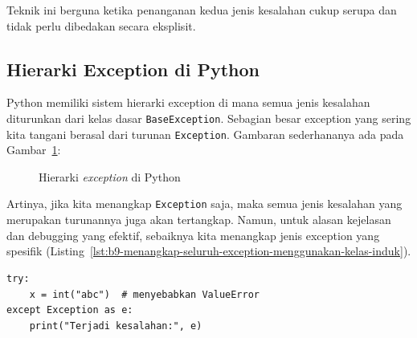 Teknik ini berguna ketika penanganan kedua jenis kesalahan cukup serupa dan tidak perlu dibedakan secara eksplisit.

\subsection*{Hierarki Exception di Python}

Python memiliki sistem hierarki exception di mana semua jenis kesalahan diturunkan dari kelas dasar \texttt{BaseException}. Sebagian besar exception yang sering kita tangani berasal dari turunan \texttt{Exception}.  
Gambaran sederhananya ada pada Gambar~\ref{fig:b9-hierarki}:

\begin{figure}[H]
  \centering
  \caption{Hierarki \textit{exception} di Python}
  \label{fig:b9-hierarki}
\end{figure}

Artinya, jika kita menangkap \texttt{Exception} saja, maka semua jenis kesalahan yang merupakan turunannya juga akan tertangkap. Namun, untuk alasan kejelasan dan debugging yang efektif, sebaiknya kita menangkap jenis exception yang spesifik (Listing~\ref{lst:b9-menangkap-seluruh-exception-menggunakan-kelas-induk}).

\begin{lstlisting}[style=PythonStyle, caption={Menangkap seluruh exception menggunakan kelas induk}, label={lst:b9-menangkap-seluruh-exception-menggunakan-kelas-induk}]
try:
    x = int("abc")  # menyebabkan ValueError
except Exception as e:
    print("Terjadi kesalahan:", e)
\end{lstlisting}

